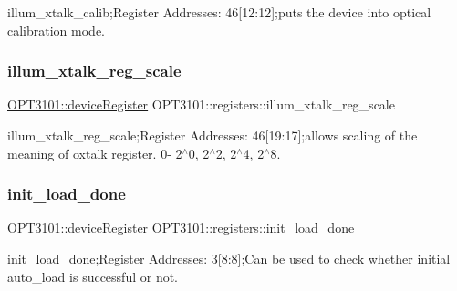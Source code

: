 illum\+\_\+xtalk\+\_\+calib;Register Addresses\+: 46\mbox{[}12\+:12\mbox{]};puts the device into optical calibration mode. 

\mbox{\label{class_o_p_t3101_1_1registers_a92394965d2a4ebd5a540ae43a9a19403}} 
\subsubsection{\texorpdfstring{illum\+\_\+xtalk\+\_\+reg\+\_\+scale}{illum\_xtalk\_reg\_scale}}
{\footnotesize\ttfamily \mbox{\hyperlink{class_o_p_t3101_1_1device_register}{O\+P\+T3101\+::device\+Register}} O\+P\+T3101\+::registers\+::illum\+\_\+xtalk\+\_\+reg\+\_\+scale}



illum\+\_\+xtalk\+\_\+reg\+\_\+scale;Register Addresses\+: 46\mbox{[}19\+:17\mbox{]};allows scaling of the meaning of oxtalk register. 0-\/ 2$^\wedge$0, 2$^\wedge$2, 2$^\wedge$4, 2$^\wedge$8. 

\mbox{\label{class_o_p_t3101_1_1registers_a84cc130f6ccf0b2827e17528cb9b0855}} 
\subsubsection{\texorpdfstring{init\+\_\+load\+\_\+done}{init\_load\_done}}
{\footnotesize\ttfamily \mbox{\hyperlink{class_o_p_t3101_1_1device_register}{O\+P\+T3101\+::device\+Register}} O\+P\+T3101\+::registers\+::init\+\_\+load\+\_\+done}



init\+\_\+load\+\_\+done;Register Addresses\+: 3\mbox{[}8\+:8\mbox{]};Can be used to check whether initial auto\+\_\+load is successful or not. 

\mbox{\label{class_o_p_t3101_1_1registers_a60e7f3df0ffecc327ff9c141797a523a}} 
